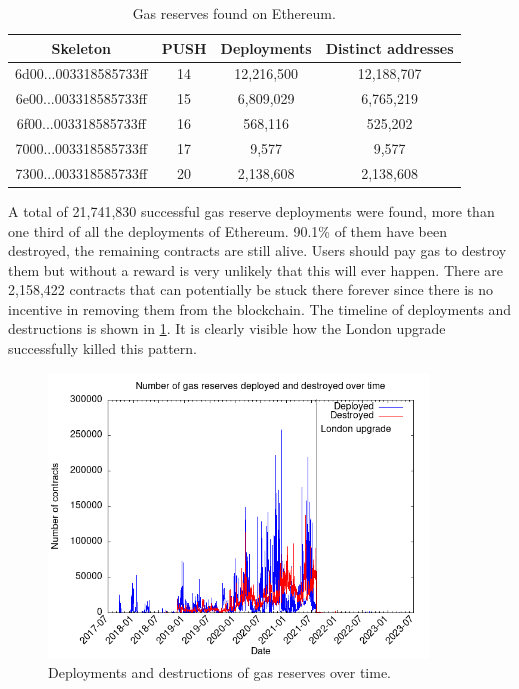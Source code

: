 \begin{table}[H]
\centering
    \begin{threeparttable}
    \begin{tabular}{ c c c c } 
    \toprule
    \textbf{Skeleton} & \textbf{PUSH} & \textbf{Deployments} & \textbf{Distinct addresses} \\
    \midrule  
    \small{6d00...003318585733ff} & 14 & 12,216,500 & 12,188,707 \\ [1.2ex]
    \small{6e00...003318585733ff} & 15 & 6,809,029 & 6,765,219 \\ [1.2ex]
    \small{6f00...003318585733ff} & 16 & 568,116 & 525,202 \\ [1.2ex]
    \small{7000...003318585733ff} & 17 & 9,577 & 9,577 \\ [1.2ex]
    \small{7300...003318585733ff} & 20 & 2,138,608 & 2,138,608 \\ [1.2ex]
    \bottomrule
    \end{tabular}
    \end{threeparttable}
    \caption{Gas reserves found on Ethereum.}
    \label{table:gas-reserve-deployments}
\end{table}

A total of 21,741,830 successful gas reserve deployments were found, more than one third of all the deployments of Ethereum. 90.1\% of them have been destroyed, the remaining contracts are still alive. Users should pay gas to destroy them but without a reward is very unlikely that this will ever happen. There are 2,158,422 contracts that can potentially be stuck there forever since there is no incentive in removing them from the blockchain. The timeline of deployments and destructions is shown in \cref{fig:gastokens-timeline}. It is clearly visible how the London upgrade successfully killed this pattern.

\begin{figure}[!ht]
    \centering
    \includegraphics[width=0.9\textwidth]{Figures/analysis/gastokens-timeline.png}
    \caption{Deployments and destructions of gas reserves over time.}
    \label{fig:gastokens-timeline}
\end{figure}

